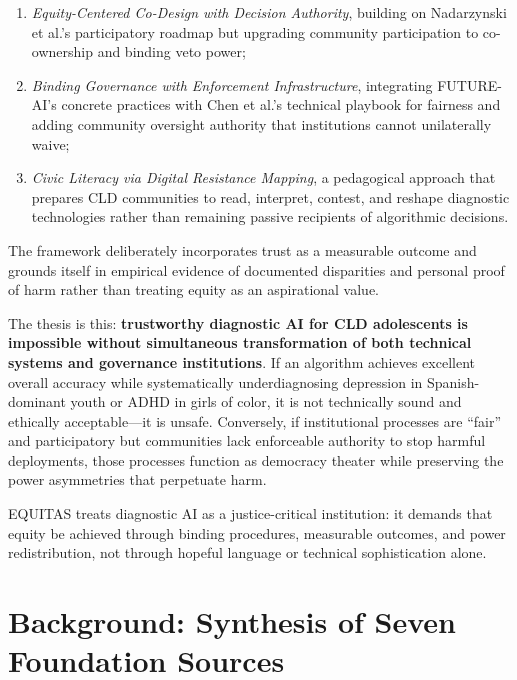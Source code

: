 \documentclass[12pt,a4paper]{article}
\begin{document}
\begin{enumerate}
    \setlength\itemsep{0.1em}
    \item \textit{Equity-Centered Co-Design with Decision Authority}, building on Nadarzynski et al.'s participatory roadmap but upgrading community participation to co-ownership and binding veto power;\cite{nadarzynski2024}
    
    \item \textit{Binding Governance with Enforcement Infrastructure}, integrating FUTURE-AI's concrete practices \cite{lekadir2025} with Chen et al.'s technical playbook for fairness \cite{chen2023} and adding community oversight authority that institutions cannot unilaterally waive;
    
    \item \textit{Civic Literacy via Digital Resistance Mapping}, a pedagogical approach that prepares CLD communities to read, interpret, contest, and reshape diagnostic technologies rather than remaining passive recipients of algorithmic decisions.\cite{garcia_ed415}
\end{enumerate}

The framework deliberately incorporates trust as a measurable outcome \cite{sagona2025} and grounds itself in empirical evidence of documented disparities \cite{marko2025} and personal proof of harm \cite{garcia_ed415} rather than treating equity as an aspirational value.

The thesis is this: \textbf{trustworthy diagnostic AI for CLD adolescents is impossible without simultaneous transformation of both technical systems and governance institutions}. If an algorithm achieves excellent overall accuracy while systematically underdiagnosing depression in Spanish-dominant youth or ADHD in girls of color, it is not technically sound and ethically acceptable—it is unsafe.\cite{marko2025} Conversely, if institutional processes are ``fair'' and participatory but communities lack enforceable authority to stop harmful deployments, those processes function as democracy theater while preserving the power asymmetries that perpetuate harm.\cite{munn_idai700}

EQUITAS treats diagnostic AI as a justice-critical institution: it demands that equity be achieved through binding procedures, measurable outcomes, and power redistribution, not through hopeful language or technical sophistication alone.

\section{Background: Synthesis of Seven Foundation Sources}
\end{document}
